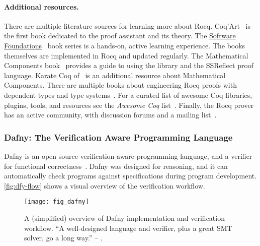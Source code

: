 \paragraph*{Additional resources.}
There are multiple literature sources for learning more about Rocq.
Coq'Art~\cite{bertot2004} is the first book dedicated to the proof assistant and its theory.
The \href{https://softwarefoundations.cis.upenn.edu/}{Software Foundations}~\cite{cpierce20221}
book series is a hands-on, active learning experience.
The books themselves are implemented in Rocq and updated regularly.
The Mathematical Components book~\cite{mahboubi2022} provides a guide to using the library and the SSReflect proof language.
Karate Coq of~\textcite{affeldt2023} is an additional resource about Mathematical Components.
There are multiple books about engineering Rocq proofs with dependent types and type systems~\cite{chlipala2022,chlipala2013,sergey2014,smolka2021}.
For a curated list of awesome Coq libraries, plugins, tools, and resources see the
\emph{Awesome Coq} list~\cite{awesome-coq}.
Finally, the Rocq prover has an active community, with discussion forums and a mailing list~\cite{rocq-community}.

\subsubsection{Dafny: The Verification Aware Programming Language}
\label{subsec:dafny}

Dafny is an open source verification-aware programming language, and a verifier for functional correctness~\cite{leino2010,dafnylang}.
Dafny was designed for reasoning, and it can automatically check programs against specifications during program development.
\autoref{fig:dfy-flow} shows a visual overview of the verification workflow.

\begin{figure}[ht]
\centering
\texttt{[image: fig\_dafny]}
\caption[Overview of Dafny implementation and verification workflow]{
A (simplified) overview of Dafny implementation and verification workflow.
\enquote{A well-designed language and verifier, plus a great SMT solver, go a long way.} -- \textcite{leino2010b}.}
\label{fig:dfy-flow}
\end{figure}

